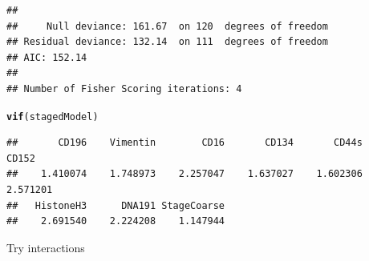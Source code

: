 \documentclass[a4paper]{article}\usepackage[]{graphicx}\usepackage[]{color}
\makeatletter
\newcommand{\hlstd}[1]{\textcolor[rgb]{0.345,0.345,0.345}{#1}}%
\newcommand{\hlkwd}[1]{\textcolor[rgb]{0.737,0.353,0.396}{\textbf{#1}}}%
\newenvironment{kframe}{%
 \def\at@end@of@kframe{}%
 \ifinner\ifhmode%
  \def\at@end@of@kframe{\end{minipage}}%
  \begin{minipage}{\columnwidth}%
 \fi\fi%
 \def\FrameCommand##1{\hskip\@totalleftmargin \hskip-\fboxsep
 \colorbox{shadecolor}{##1}\hskip-\fboxsep
     \hskip-\linewidth \hskip-\@totalleftmargin \hskip\columnwidth}%
 \MakeFramed {\advance\hsize-\width
   \@totalleftmargin\z@ \linewidth\hsize
   \@setminipage}}%
 {\par\unskip\endMakeFramed%
 \at@end@of@kframe}
\newenvironment{knitrout}{}{} %
\makeatother
\begin{document}
\begin{knitrout}
\begin{kframe}
\begin{verbatim}
## 
##     Null deviance: 161.67  on 120  degrees of freedom
## Residual deviance: 132.14  on 111  degrees of freedom
## AIC: 152.14
## 
## Number of Fisher Scoring iterations: 4
\end{verbatim}
\begin{alltt}
\hlkwd{vif}\hlstd{(stagedModel)}
\end{alltt}
\begin{verbatim}
##       CD196    Vimentin        CD16       CD134       CD44s       CD152 
##    1.410074    1.748973    2.257047    1.637027    1.602306    2.571201 
##   HistoneH3      DNA191 StageCoarse 
##    2.691540    2.224208    1.147944
\end{verbatim}
\end{kframe}
\end{knitrout}

Try interactions
\end{document}
